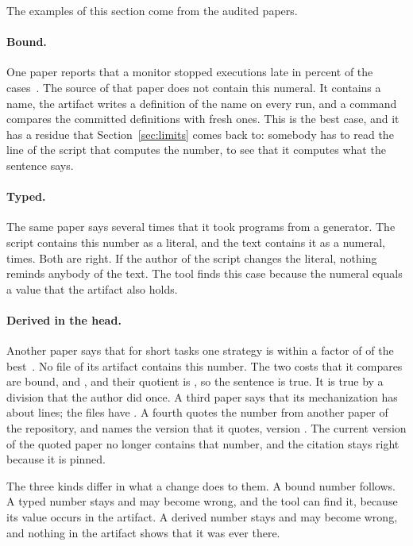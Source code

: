 \documentclass[acmsmall,nonacm,screen]{acmart}
\begin{document}
The examples of this section come from the audited papers.

\paragraph{Bound.} One paper reports that a monitor stopped executions late in
\exEgBound{} percent of the cases~\citep{tpp4}. The source of that paper does not contain
this numeral. It contains a name, the artifact writes a definition of the name on every run,
and a command compares the committed definitions with fresh ones. This is the best case, and
it has a residue that Section~\ref{sec:limits} comes back to: somebody has to read the line
of the script that computes the number, to see that it computes what the sentence says.

\paragraph{Typed.} The same paper says several times that it took \exEgTwice{} programs from
a generator. The script contains this number as a literal, and the text contains it as a
numeral, \exEgTwiceCount{} times. Both are right. If the author of the script changes the
literal, nothing reminds anybody of the text. The tool finds this case because the numeral
equals a value that the artifact also holds.

\paragraph{Derived in the head.} Another paper says that for short tasks one strategy is
within a factor of \exEgDerived{} of the best~\citep{tpp6}. No file of its artifact contains
this number. The two costs that it compares are bound, \exEgPlain{} and \exEgComp{}, and
their quotient is \exEgDerivedTrue{}, so the sentence is true. It is true by a division that
the author did once. A third paper says that its mechanization has about \exEgSize{} lines;
the files have \exEgSizeTrue{}. A fourth quotes the number \exEgCited{} from another paper of
the repository, and names the version that it quotes, version \exEgCitedVersion{}. The
current version of the quoted paper no longer contains that number, and the citation stays
right because it is pinned.

The three kinds differ in what a change does to them. A bound number follows. A typed number
stays and may become wrong, and the tool can find it, because its value occurs in the
artifact. A derived number stays and may become wrong, and nothing in the artifact shows
that it was ever there.
\end{document}
